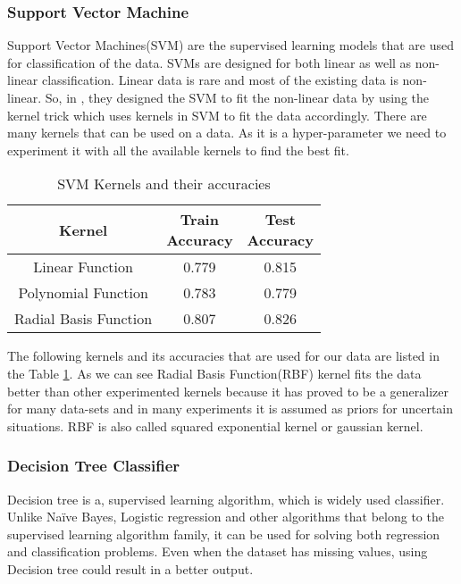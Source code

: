 \documentclass[conference]{IEEEtran}
\begin{document}
\subsubsection*{Support Vector Machine}
Support Vector Machines(SVM) are the supervised learning models that are used for classification of the data. SVMs are designed for both linear as well as non-linear classification. Linear data is rare and most of the existing data is non-linear. So, in \cite{svm}, they designed the SVM to fit the non-linear data by using the kernel trick which uses kernels in SVM to fit the data accordingly. There are many kernels that can be used on a data. As it is a hyper-parameter we need to experiment it with all the available kernels to find the best fit.
\begin{table}[ht]
\centering
 \begin{tabular}{|c| c c|} 
 \hline
 Kernel  & \thead{Train \\ Accuracy} & \thead{Test \\ Accuracy} \\ [0.5ex] 
 \hline
 Linear Function & 0.779 & 0.815\\ 

 Polynomial Function & 0.783 & 0.779\\
 
 Radial Basis Function & 0.807 & 0.826\\
 \hline
\end{tabular}
\vspace*{0.25cm}
\caption{SVM Kernels and their accuracies}
\label{table:svm}
\end{table}
\par
The following kernels and its accuracies that are used for our data are listed in the Table \ref{table:svm}. As we can see Radial Basis Function(RBF) kernel fits the data better than other experimented kernels because it has proved to be a generalizer for many data-sets and in many experiments it is assumed as priors for uncertain situations. RBF is also called squared exponential kernel or gaussian kernel.            

\subsubsection*{Decision Tree Classifier}
Decision tree is a, supervised learning algorithm, which is widely used classifier. Unlike Naïve Bayes, Logistic regression and other algorithms that belong to the supervised learning algorithm family, it can be used for solving both regression and classification problems. Even when the dataset has missing values, using Decision tree could result in a better output.
\par
\end{document}
